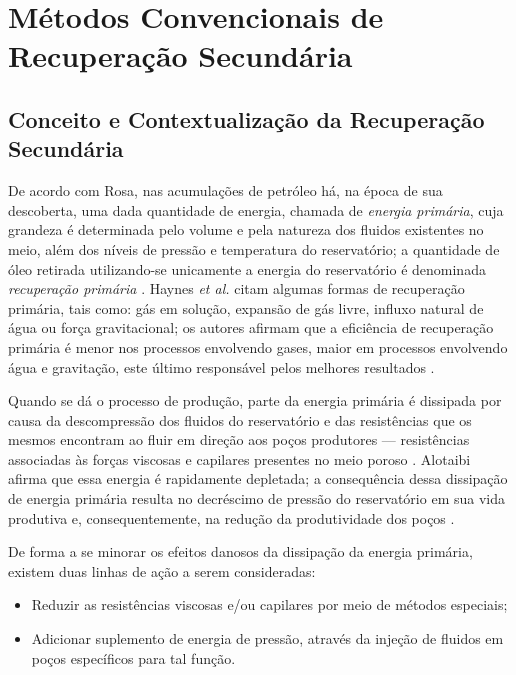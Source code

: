 
\section{M\'{e}todos Convencionais de Recupera\c{c}\~{a}o Secund\'{a}ria}

\subsection{Conceito e Contextualiza\c{c}\~{a}o da Recupera\c{c}\~{a}o Secund\'{a}ria}

De acordo com Rosa, nas acumula\c{c}\~{o}es de petr\'{o}leo h\'{a}, na \'{e}poca de sua descoberta, uma dada quantidade de energia, chamada de \textit{energia prim\'{a}ria}, cuja grandeza \'{e} determinada pelo volume e pela natureza dos fluidos existentes no meio, al\'{e}m dos n\'{i}veis de press\~{a}o e temperatura do reservat\'{o}rio; a quantidade de \'{o}leo retirada utilizando-se unicamente a energia do reservat\'{o}rio \'{e} denominada \textit{recupera\c{c}\~{a}o prim\'{a}ria} \cite{engres}. Haynes \textit{et al.} citam algumas formas de recupera\c{c}\~{a}o prim\'{a}ria, tais como: g\'{a}s em solu\c{c}\~{a}o, expans\~{a}o de g\'{a}s livre, influxo natural de \'{a}gua ou for\c{c}a gravitacional; os autores afirmam que a efici\^{e}ncia de recupera\c{c}\~{a}o prim\'{a}ria \'{e} menor nos processos envolvendo gases, maior em processos envolvendo \'{a}gua e gravita\c{c}\~{a}o, este \'{u}ltimo respons\'{a}vel pelos melhores resultados \cite{oil1976}.

Quando se d\'{a} o processo de produ\c{c}\~{a}o, parte da energia prim\'{a}ria \'{e} dissipada por causa da descompress\~{a}o dos fluidos do reservat\'{o}rio e das resist\^{e}ncias que os mesmos encontram ao fluir em dire\c{c}\~{a}o aos po\c{c}os produtores --- resist\^{e}ncias associadas \`{a}s for\c{c}as viscosas e capilares presentes no meio poroso \cite{engres}. Alotaibi afirma que essa energia \'{e} rapidamente depletada; a consequ\^{e}ncia dessa dissipa\c{c}\~{a}o de energia prim\'{a}ria resulta no decr\'{e}scimo de press\~{a}o do reservat\'{o}rio em sua vida produtiva e, consequentemente, na redu\c{c}\~{a}o da produtividade dos po\c{c}os \cite{alotaibi}. 

De forma a se minorar os efeitos danosos da dissipa\c{c}\~{a}o da energia prim\'{a}ria, existem duas linhas de a\c{c}\~{a}o a serem consideradas:

\begin{itemize}
\item Reduzir as resist\^{e}ncias viscosas e/ou capilares por meio de m\'{e}todos especiais;
\item Adicionar suplemento de energia de press\~{a}o, atrav\'{e}s da inje\c{c}\~{a}o de fluidos em poços espec\'{i}ficos para tal fun\c{c}\~{a}o.
\end{itemize}

